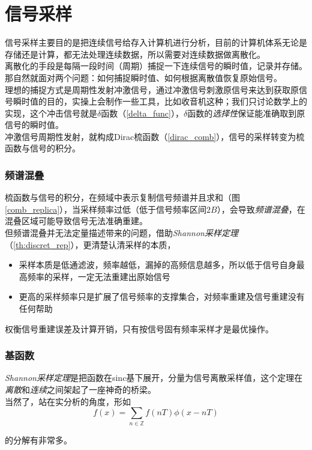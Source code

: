 \section{信号采样}

信号采样主要目的是把连续信号给存入计算机进行分析，目前的计算机体系无论是存储还是计算，都无法处理连续数据，所以需要对连续数据做离散化。\\

离散化的手段是每隔一段时间（周期）捕捉一下连续信号的瞬时值，记录并存储。那自然就面对两个问题：如何捕捉瞬时值、如何根据离散值恢复原始信号。\\

理想的捕捉方式是周期性发射冲激信号，通过冲激信号刺激原信号来达到获取原信号瞬时值的目的，实操上会制作一些工具，比如收音机这种；我们只讨论数学上的实现，这个冲击信号就是$\delta$函数（\ref{delta_func}），$\delta$函数的\textit{选择性}保证能准确取到原信号的瞬时值。\\

冲激信号周期性发射，就构成Dirac梳函数（\ref{dirac_comb}），信号的采样转变为梳函数与信号的积分。

\subsubsection*{频谱混叠}

梳函数与信号的积分，在频域中表示复制信号频谱并且求和（图\ref{comb_replica}），当采样频率过低（低于信号频率区间$2B$），会导致\textit{频谱混叠}，在混叠区域可能导致信号无法准确重建。\\

但频谱混叠并无法定量描述带来的问题，借助\textit{Shannon采样定理}（\ref{th:discret_rep}），更清楚认清采样的本质，
\begin{itemize}
	\item 采样本质是低通滤波，频率越低，漏掉的高频信息越多，所以低于信号自身最高频率的采样，一定无法重建出原始信号
	\item 更高的采样频率只是扩展了信号频率的支撑集合，对频率重建及信号重建没有任何帮助
\end{itemize}

权衡信号重建误差及计算开销，只有按信号固有频率采样才是最优操作。

\subsubsection*{基函数}

\textit{Shannon采样定理}是把函数在sinc基下展开，分量为信号离散采样值，这个定理在\textit{离散}和\textit{连续}之间架起了一座神奇的桥梁。\\

当然了，站在实分析的角度，形如
$$
	f(x) = \sum_{n\in \mathbb{Z}}f(nT)\phi(x-nT)
$$

的分解有非常多。